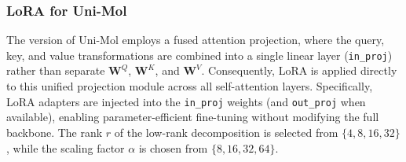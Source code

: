 \documentclass[pdflatex,sn-mathphys-num,Numbered]{sn-jnl}%
\begin{document}
\subsubsection{LoRA for Uni-Mol}
The version of Uni-Mol employs a fused attention projection, where the query, key, and value transformations are combined into a single linear layer (\texttt{in\_proj}) rather than separate $\mathbf{W}^Q$, $\mathbf{W}^K$, and $\mathbf{W}^V$. Consequently, LoRA is applied directly to this unified projection module across all self-attention layers. Specifically, LoRA adapters are injected into the \texttt{in\_proj} weights (and \texttt{out\_proj} when available), enabling parameter-efficient fine-tuning without modifying the full backbone. The rank $r$ of the low-rank decomposition is selected from $\{4, 8, 16, 32\}$, while the scaling factor $\alpha$ is chosen from $\{8, 16, 32, 64\}$.
\end{document}

